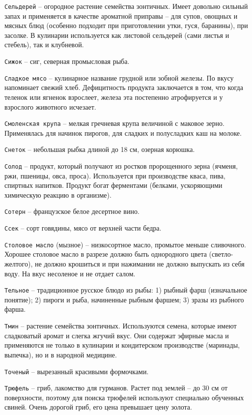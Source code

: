 {\tt Сельдерей} – огородное растение семейства зонтичных. Имеет довольно сильный запах и применяется в качестве ароматной приправы – для супов, овощных и мясных блюд (особенно подходит при приготовлении утки, гуся, баранины), при засолке. В кулинарии используется как листовой сельдерей (сами листья и стебель), так и клубневой.

{\tt Сижок} – сиг, северная промысловая рыба.

{\tt Сладкое мясо} – кулинарное название грудной или зобной железы. По вкусу напоминает свежий хлеб. Дефицитность продукта заключается в том, что когда теленок или ягненок взрослеет, железа эта постепенно атрофируется и у взрослого животного исчезает. 

{\tt Смоленская крупа} – мелкая гречневая крупа величиной с маковое зерно. Применялась для начинок пирогов, для сладких и полусладких каш на молоке.

{\tt Снеток} – небольшая рыбка длиной до 18 см, озерная корюшка.

{\tt Солод} – продукт, который получают из ростков пророщенного зерна (ячменя, ржи, пшеницы, овса, проса). Используется при производстве кваса, пива, спиртных напитков. Продукт богат ферментами (белками, ускоряющими химическую реакцию в организме). 

{\tt Сотерн} – французское белое десертное вино. 

{\tt Ссек} – сорт говядины, мясо от верхней части бедра. 

{\tt Столовое масло} (мызное) – низкосортное масло, промытое меньше сливочного. Хорошее столовое масло в разрезе должно быть однородного цвета (светло-желтого), не должно крошиться и при нажимании не должно выпускать из себя воду. На вкус несоленое и не отдает салом.

{\tt Тельное} – традиционное русское блюдо из рыбы: 1) рыбный фарш (изначальное понятие); 2) пироги и рыба, начиненные рыбным фаршем; 3) зразы из рыбного фарша. 

{\tt Тмин} – растение семейства зонтичных. Используются семена, которые имеют сладковатый аромат и слегка жгучий вкус. Они содержат эфирные масла и применяются не только в кулинарии и кондитерском производстве (маринады, выпечка), но и в народной медицине.

{\tt Точеный} – вырезанный красивыми формочками. 

{\tt Трюфель} – гриб, лакомство для гурманов. Растет под землей – до 30 см от поверхности, поэтому для поиска трюфелей используют специально обученных свиней. Очень дорогой гриб, его цена превышает цену золота.

